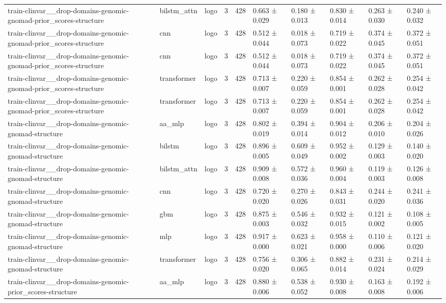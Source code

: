 \begin{table}[t]
\begin{tabular}{llllllllll}
train-clinvar\_\_drop-domains-genomic-gnomad-prior\_scores-structure & bilstm\_attn & logo & 3 & 428 & 0.663 ± 0.029 & 0.180 ± 0.013 & 0.830 ± 0.014 & 0.263 ± 0.030 & 0.240 ± 0.032 \\
train-clinvar\_\_drop-domains-genomic-gnomad-prior\_scores-structure & cnn & logo & 3 & 428 & 0.512 ± 0.044 & 0.018 ± 0.073 & 0.719 ± 0.022 & 0.374 ± 0.045 & 0.372 ± 0.051 \\
train-clinvar\_\_drop-domains-genomic-gnomad-prior\_scores-structure & cnn & logo & 3 & 428 & 0.512 ± 0.044 & 0.018 ± 0.073 & 0.719 ± 0.022 & 0.374 ± 0.045 & 0.372 ± 0.051 \\
train-clinvar\_\_drop-domains-genomic-gnomad-prior\_scores-structure & transformer & logo & 3 & 428 & 0.713 ± 0.007 & 0.220 ± 0.059 & 0.854 ± 0.001 & 0.262 ± 0.028 & 0.254 ± 0.042 \\
train-clinvar\_\_drop-domains-genomic-gnomad-prior\_scores-structure & transformer & logo & 3 & 428 & 0.713 ± 0.007 & 0.220 ± 0.059 & 0.854 ± 0.001 & 0.262 ± 0.028 & 0.254 ± 0.042 \\
train-clinvar\_\_drop-domains-genomic-gnomad-structure & aa\_mlp & logo & 3 & 428 & 0.802 ± 0.019 & 0.394 ± 0.014 & 0.904 ± 0.012 & 0.206 ± 0.010 & 0.204 ± 0.026 \\
train-clinvar\_\_drop-domains-genomic-gnomad-structure & bilstm & logo & 3 & 428 & 0.896 ± 0.005 & 0.609 ± 0.049 & 0.952 ± 0.002 & 0.129 ± 0.003 & 0.140 ± 0.020 \\
train-clinvar\_\_drop-domains-genomic-gnomad-structure & bilstm\_attn & logo & 3 & 428 & 0.909 ± 0.008 & 0.572 ± 0.036 & 0.960 ± 0.004 & 0.119 ± 0.003 & 0.126 ± 0.008 \\
train-clinvar\_\_drop-domains-genomic-gnomad-structure & cnn & logo & 3 & 428 & 0.720 ± 0.020 & 0.270 ± 0.026 & 0.843 ± 0.031 & 0.244 ± 0.020 & 0.241 ± 0.036 \\
train-clinvar\_\_drop-domains-genomic-gnomad-structure & gbm & logo & 3 & 428 & 0.875 ± 0.003 & 0.546 ± 0.032 & 0.932 ± 0.015 & 0.121 ± 0.002 & 0.108 ± 0.005 \\
train-clinvar\_\_drop-domains-genomic-gnomad-structure & mlp & logo & 3 & 428 & 0.917 ± 0.000 & 0.623 ± 0.021 & 0.958 ± 0.000 & 0.110 ± 0.006 & 0.121 ± 0.020 \\
train-clinvar\_\_drop-domains-genomic-gnomad-structure & transformer & logo & 3 & 428 & 0.756 ± 0.020 & 0.306 ± 0.065 & 0.882 ± 0.014 & 0.231 ± 0.024 & 0.214 ± 0.029 \\
train-clinvar\_\_drop-domains-genomic-prior\_scores-structure & aa\_mlp & logo & 3 & 428 & 0.880 ± 0.006 & 0.538 ± 0.052 & 0.930 ± 0.008 & 0.163 ± 0.008 & 0.192 ± 0.006 \\

\end{tabular}
\end{table}
